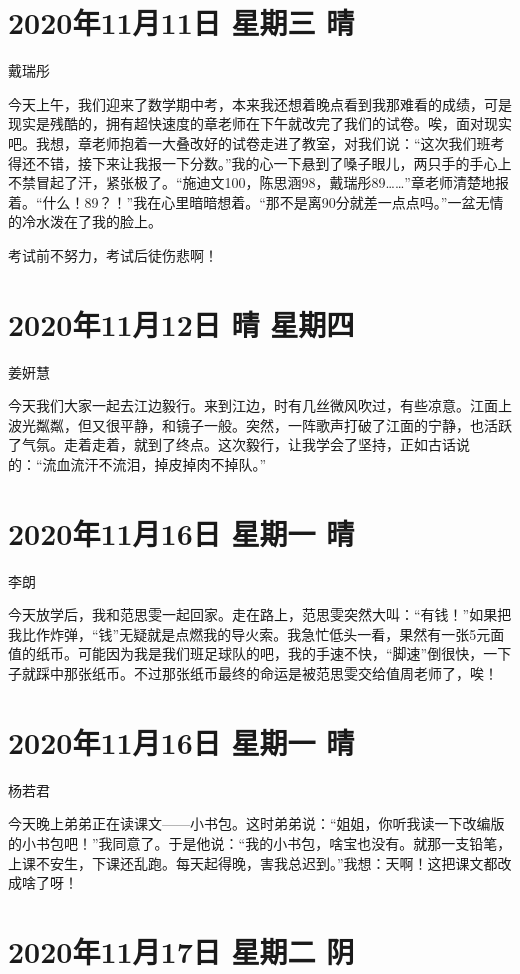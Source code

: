 \section{2020年11月11日 星期三 晴}

戴瑞彤

今天上午，我们迎来了数学期中考，本来我还想着晚点看到我那难看的成绩，可是现实是残酷的，拥有超快速度的章老师在下午就改完了我们的试卷。唉，面对现实吧。我想，章老师抱着一大叠改好的试卷走进了教室，对我们说：“这次我们班考得还不错，接下来让我报一下分数。”我的心一下悬到了嗓子眼儿，两只手的手心上不禁冒起了汗，紧张极了。“施迪文100，陈思涵98，戴瑞彤89……”章老师清楚地报着。“什么！89？！”我在心里暗暗想着。“那不是离90分就差一点点吗。”一盆无情的冷水泼在了我的脸上。

考试前不努力，考试后徒伤悲啊！

\section{2020年11月12日 晴 星期四}

姜姸慧

今天我们大家一起去江边毅行。来到江边，时有几丝微风吹过，有些凉意。江面上波光粼粼，但又很平静，和镜子一般。突然，一阵歌声打破了江面的宁静，也活跃了气氛。走着走着，就到了终点。这次毅行，让我学会了坚持，正如古话说的：“流血流汗不流泪，掉皮掉肉不掉队。”

\section{2020年11月16日 星期一 晴}

李朗

今天放学后，我和范思雯一起回家。走在路上，范思雯突然大叫：“有钱！”如果把我比作炸弹，“钱”无疑就是点燃我的导火索。我急忙低头一看，果然有一张5元面值的纸币。可能因为我是我们班足球队的吧，我的手速不快，“脚速”倒很快，一下子就踩中那张纸币。不过那张纸币最终的命运是被范思雯交给值周老师了，唉！

\section{2020年11月16日 星期一 晴}

杨若君

今天晚上弟弟正在读课文——小书包。这时弟弟说：“姐姐，你听我读一下改编版的小书包吧！”我同意了。于是他说：“我的小书包，啥宝也没有。就那一支铅笔，上课不安生，下课还乱跑。每天起得晚，害我总迟到。”我想：天啊！这把课文都改成啥了呀！

\section{2020年11月17日 星期二 阴}


